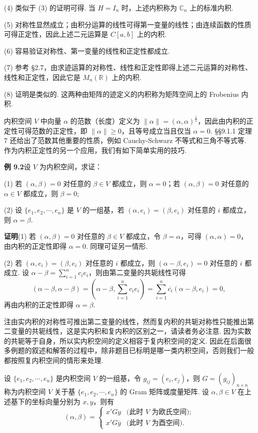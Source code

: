 \documentclass[UTF8, 12pt, fontset=fandol, oneside]{ctexart}
\begin{document}
(4) 类似于 (3) 的证明可得. 当 $H=I_n$ 时，上述内积称为 $\mathbb{C}_n$ 上的标准内积.

(5) 对称性显然成立；由积分运算的线性可得第一变量的线性；由连续函数的性质可得正定性，因此上述二元运算是 $C[a,b]$ 上的内积.

(6) 容易验证对称性、第一变量的线性和正定性都成立.

(7) 参考 §2.7，由求迹运算的对称性、线性和正定性即得上述二元运算的对称性、线性和正定性，因此它是 $M_n(\mathbb{R})$ 上的内积.

(8) 证明是类似的. 这两种由矩阵的迹定义的内积称为矩阵空间上的 Frobenius 内积.

内积空间 $V$ 中向量 $\alpha$ 的范数（长度）定义为 $\|\alpha\|=(\alpha,\alpha)^{\frac12}$，因此由内积的正定性可得范数的正定性，即 $\|\alpha\|\ge 0$，且等号成立当且仅当 $\alpha=0$. §§9.1.1 定理 7 还给出了范数其他重要的性质，例如 Cauchy-Schwarz 不等式和三角不等式等. 作为内积正定性的另一个应用，我们有如下简单实用的技巧.

\noindent\textbf{例 9.2}\quad 设 $V$ 为内积空间，求证：

(1) 若 $(\alpha,\beta)=0$ 对任意的 $\beta\in V$ 都成立，则 $\alpha=0$；若 $(\alpha,\beta)=0$ 对任意的 $\alpha\in V$ 都成立，则 $\beta=0$;

(2) 设 $\{e_1,e_2,\cdots,e_n\}$ 是 $V$ 的一组基，若 $(\alpha,e_i)=(\beta,e_i)$ 对任意的 $i$ 都成立，则 $\alpha=\beta$.

\noindent\textbf{证明}\quad (1) 若 $(\alpha,\beta)=0$ 对任意的 $\beta\in V$ 都成立，令 $\beta=\alpha$，可得 $(\alpha,\alpha)=0$，由内积的正定性即得 $\alpha=0$. 同理可证另一情形.

(2) 若 $(\alpha,e_i)=(\beta,e_i)$ 对任意的 $i$ 都成立，则 $(\alpha-\beta,e_i)=0$ 对任意的 $i$ 都成立. 设 $\alpha-\beta=\sum_{i=1}^n c_ie_i$，则由第二变量的共轭线性可得
\[
(\alpha-\beta,\alpha-\beta)=\left(\alpha-\beta,\sum_{i=1}^n c_ie_i\right)
=\sum_{i=1}^n \overline{c_i}(\alpha-\beta,e_i)=0,
\]
再由内积的正定性即得 $\alpha=\beta$.

注\quad 由实内积的对称性可推出第二变量的线性，然而复内积的共轭对称性只能推出第二变量的共轭线性，这是实内积和复内积的区别之一，请读者务必注意. 因为实数的共轭等于自身，所以实内积空间的定义相容于复内积空间的定义. 因此在后面很多例题的叙述和解答的过程中，除非题目已标明是哪一类内积空间，否则我们一般都按照复内积空间的情形来处理.

设 $\{e_1,e_2,\cdots,e_n\}$ 是内积空间 $V$ 的一组基，令 $g_{ij}=(e_i,e_j)$，则 $G=(g_{ij})_{n\times n}$ 称为内积空间 $V$ 关于基 $\{e_1,e_2,\cdots,e_n\}$ 的 Gram 矩阵或度量矩阵. 设 $\alpha,\beta\in V$ 在上述基下的坐标向量分别为 $x,y$，则有
\begin{equation}
(\alpha,\beta)=
\begin{cases}
x'Gy & \text{(此时 $V$ 为欧氏空间);} \\
x'G\overline{y} & \text{(此时 $V$ 为酉空间).}
\end{cases}
\tag{9.2}
\end{equation}
\end{document}
